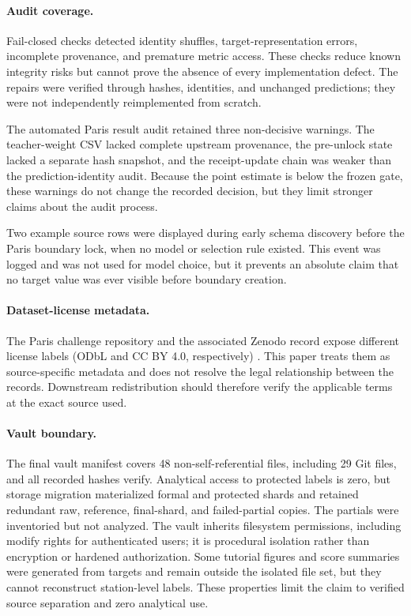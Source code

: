 \paragraph{Audit coverage.}
Fail-closed checks detected identity shuffles, target-representation errors, incomplete provenance, and premature metric access. These checks reduce known integrity risks but cannot prove the absence of every implementation defect. The repairs were verified through hashes, identities, and unchanged predictions; they were not independently reimplemented from scratch.

The automated Paris result audit retained three non-decisive warnings. The teacher-weight CSV lacked complete upstream provenance, the pre-unlock state lacked a separate hash snapshot, and the receipt-update chain was weaker than the prediction-identity audit. Because the point estimate is below the frozen gate, these warnings do not change the recorded decision, but they limit stronger claims about the audit process.

Two example source rows were displayed during early schema discovery before the Paris boundary lock, when no model or selection rule existed. This event was logged and was not used for model choice, but it prevents an absolute claim that no target value was ever visible before boundary creation.

\paragraph{Dataset-license metadata.}
The Paris challenge repository and the associated Zenodo record expose different license labels (ODbL and CC BY 4.0, respectively) \cite{amaraouali2024smarter,amaraouali2023parisdataset}. This paper treats them as source-specific metadata and does not resolve the legal relationship between the records. Downstream redistribution should therefore verify the applicable terms at the exact source used.

\paragraph{Vault boundary.}
The final vault manifest covers 48 non-self-referential files, including 29 Git files, and all recorded hashes verify. Analytical access to protected labels is zero, but storage migration materialized formal and protected shards and retained redundant raw, reference, final-shard, and failed-partial copies. The partials were inventoried but not analyzed. The vault inherits filesystem permissions, including modify rights for authenticated users; it is procedural isolation rather than encryption or hardened authorization. Some tutorial figures and score summaries were generated from targets and remain outside the isolated file set, but they cannot reconstruct station-level labels. These properties limit the claim to verified source separation and zero analytical use.

